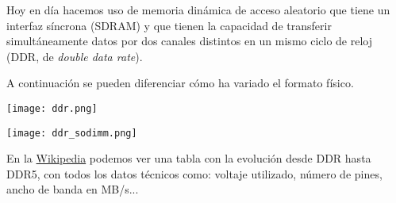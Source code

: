 Hoy en día hacemos uso de memoria dinámica de acceso aleatorio que tiene un interfaz síncrona (SDRAM) y que tienen la capacidad de transferir simultáneamente datos por dos canales distintos en un mismo ciclo de reloj (DDR, de \textit{double data rate}).

A continuación se pueden diferenciar cómo ha variado el formato físico.

{
    \hfill
\begin{minipage}{0.45\linewidth}
    \texttt{[image: ddr.png]}
    \vspace{-30pt}
\end{minipage}
\hfill\hfill
\begin{minipage}{0.3\linewidth}
    \texttt{[image: ddr\_sodimm.png]}
    \vspace{-30pt}
\end{minipage}
\hfill
}

En la \href{https://en.wikipedia.org/wiki/DDR_SDRAM#Generations}{Wikipedia} podemos ver una tabla con la evolución desde DDR hasta DDR5, con todos los datos técnicos como: voltaje utilizado, número de pines, ancho de banda en MB/s...


%
%
%
%
%
